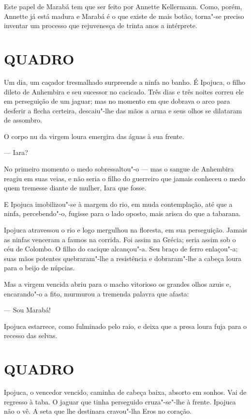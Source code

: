 Este papel de Marabá tem que ser feito por Annette Kellermann. Como,
porém, Annette já está madura e Marabá é o que existe de mais botão,
torna"-se preciso inventar um processo que rejuvenesça de trinta anos a
intérprete.

\section*{QUADRO}

Um dia, um caçador tresmalhado surpreende a ninfa no banho. É Ipojuca, o
filho dileto de Anhembira e seu sucessor no cacicado. Três dias e três
noites correu ele em perseguição de um jaguar; mas no momento em que
dobrava o arco para desferir a flecha certeira, descaiu"-lhe das mãos a
arma e seus olhos se dilataram de assombro.

O corpo nu da virgem loura emergira das águas à sua frente.

--- Iara?

No primeiro momento o medo sobressaltou"-o --- mas o sangue de Anhembira
reagiu em suas veias, e não seria o filho do guerreiro que jamais
conheceu o medo quem tremesse diante de mulher, Iara que fosse.

E Ipojuca imobilizou"-se à margem do rio, em muda contemplação, até que a
ninfa, percebendo"-o, fugisse para o lado oposto, mais arisca do que a
tabarana.

Ipojuca atravessou o rio e logo mergulhou na floresta, em sua
perseguição. Jamais as ninfas venceram a faunos na corrida. Foi assim na
Grécia; seria assim sob o céu de Colombo. O filho do cacique alcançou"-a.
Seu braço de ferro enlaçou"-a; suas mãos potentes quebraram"-lhe a
resistência e dobraram"-lhe a cabeça loura para o beijo de núpcias.

Mas a virgem vencida abriu para o macho vitorioso os grandes olhos azuis
e, encarando"-o a fito, murmurou a tremenda palavra que afasta:

--- Sou Marabá!

Ipojuca estarrece, como fulminado pelo raio, e deixa que a presa loura
fuja para o recesso das selvas.

\section*{QUADRO}

Ipojuca, o vencedor vencido, caminha de cabeça baixa, absorto em sonhos.
Vai de regresso à taba. O jaguar que tinha perseguido cruza"-se"-lhe à
frente. Ipojuca não o vê. A seta que lhe destinara cravou"-lha Eros no
coração.

